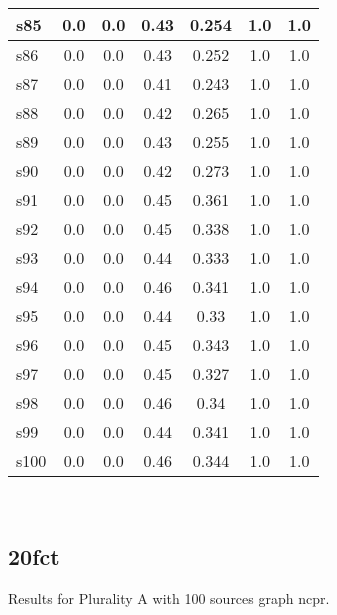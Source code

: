 \documentclass{article}
\begin{document}
\begin{tabular}{|l|c|c|c|c|c|c|}
\hline
s85 &0.0 & 0.0 & 0.43 & 0.254 & 1.0 & 1.0\\
\hline
s86 &0.0 & 0.0 & 0.43 & 0.252 & 1.0 & 1.0\\
\hline
s87 &0.0 & 0.0 & 0.41 & 0.243 & 1.0 & 1.0\\
\hline
s88 &0.0 & 0.0 & 0.42 & 0.265 & 1.0 & 1.0\\
\hline
s89 &0.0 & 0.0 & 0.43 & 0.255 & 1.0 & 1.0\\
\hline
s90 &0.0 & 0.0 & 0.42 & 0.273 & 1.0 & 1.0\\
\hline
s91 &0.0 & 0.0 & 0.45 & 0.361 & 1.0 & 1.0\\
\hline
s92 &0.0 & 0.0 & 0.45 & 0.338 & 1.0 & 1.0\\
\hline
s93 &0.0 & 0.0 & 0.44 & 0.333 & 1.0 & 1.0\\
\hline
s94 &0.0 & 0.0 & 0.46 & 0.341 & 1.0 & 1.0\\
\hline
s95 &0.0 & 0.0 & 0.44 & 0.33 & 1.0 & 1.0\\
\hline
s96 &0.0 & 0.0 & 0.45 & 0.343 & 1.0 & 1.0\\
\hline
s97 &0.0 & 0.0 & 0.45 & 0.327 & 1.0 & 1.0\\
\hline
s98 &0.0 & 0.0 & 0.46 & 0.34 & 1.0 & 1.0\\
\hline
s99 &0.0 & 0.0 & 0.44 & 0.341 & 1.0 & 1.0\\
\hline
s100 &0.0 & 0.0 & 0.46 & 0.344 & 1.0 & 1.0\\
\hline
\end{tabular}\\

\newpage

\subsection{20fct}

\noindent Results for Plurality A with 100 sources graph ncpr.
\end{document}
